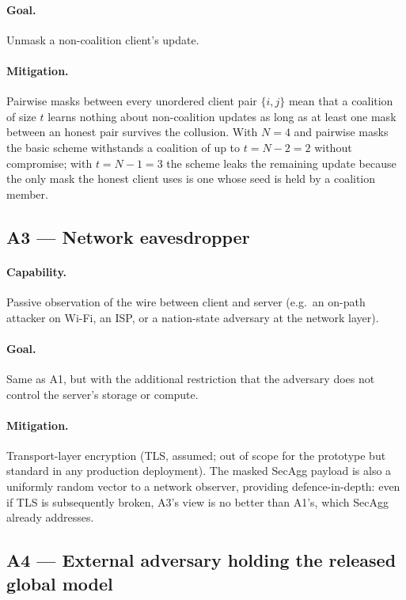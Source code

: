 \documentclass[11pt,a4paper]{report}
\begin{document}
\paragraph{Goal.} Unmask a non-coalition client's update.

\paragraph{Mitigation.} Pairwise masks between every unordered client pair
$\{i,j\}$ mean that a coalition of size $t$ learns nothing about non-coalition
updates as long as at least one mask between an honest pair survives the
collusion. With $N = 4$ and pairwise masks the basic scheme withstands a
coalition of up to $t = N - 2 = 2$ without compromise; with $t = N - 1 = 3$
the scheme leaks the remaining update because the only mask the honest
client uses is one whose seed is held by a coalition member.

\subsection{A3 --- Network eavesdropper}

\paragraph{Capability.} Passive observation of the wire between client and
server (e.g.\ an on-path attacker on Wi-Fi, an ISP, or a nation-state
adversary at the network layer).

\paragraph{Goal.} Same as A1, but with the additional restriction that the
adversary does not control the server's storage or compute.

\paragraph{Mitigation.} Transport-layer encryption (TLS, assumed; out of
scope for the prototype but standard in any production deployment). The
masked SecAgg payload is also a uniformly random vector to a network
observer, providing defence-in-depth: even if TLS is subsequently broken,
A3's view is no better than A1's, which SecAgg already addresses.

\subsection{A4 --- External adversary holding the released global model}
\end{document}
